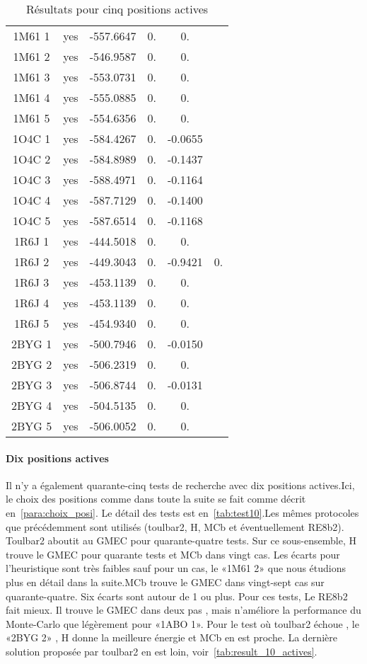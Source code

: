 \begin{table}[h]
{\begin{tabular}{cccccc}
        1M61 1 & yes &  -557.6647 & 0. & 0. &  \\
        1M61 2 & yes &  -546.9587 & 0. & 0. &  \\
        1M61 3 & yes &  -553.0731 & 0. & 0. &  \\
        1M61 4 & yes &  -555.0885 & 0. & 0. &  \\
        1M61 5 & yes &  -554.6356 & 0. & 0. &  \\
        1O4C 1 & yes &  -584.4267 & 0. & -0.0655 &  \\
        1O4C 2 & yes &  -584.8989 & 0. & -0.1437 &  \\
        1O4C 3 & yes &  -588.4971 & 0. & -0.1164 &  \\
        1O4C 4 & yes &  -587.7129 & 0. & -0.1400 &  \\
        1O4C 5 & yes &  -587.6514 & 0. & -0.1168 &  \\
        1R6J 1 & yes &  -444.5018 & 0. & 0. &  \\
        1R6J 2 & yes &  -449.3043 & 0. & -0.9421 & 0. \\
        1R6J 3 & yes &  -453.1139 & 0. & 0. &  \\
        1R6J 4 & yes &  -453.1139 & 0. & 0. &  \\
        1R6J 5 & yes &  -454.9340 & 0. & 0. &  \\
        2BYG 1 & yes &  -500.7946 & 0. & -0.0150 &  \\
        2BYG 2 & yes &  -506.2319 & 0. & 0. &  \\
        2BYG 3 & yes &  -506.8744 & 0. & -0.0131 &  \\
        2BYG 4 & yes &  -504.5135 & 0. & 0. &  \\
        2BYG 5 & yes &  -506.0052 & 0. & 0. &  \\
        \bottomrule
      \end{tabular}      
}
 \caption{Résultats pour cinq positions actives}
\label{tab:result_5_actives}
\end{table}

   \paragraph{Dix positions actives}
Il n'y a également quarante-cinq tests de recherche avec dix positions actives.Ici, le choix des positions comme dans toute la suite se fait comme décrit en~\ref{para:choix_posi}. Le détail des tests est en~\ref{tab:test10}.Les mêmes protocoles que précédemment sont utilisés (toulbar2, H, MCb et éventuellement RE8b2). Toulbar2 aboutit au GMEC pour quarante-quatre tests. Sur ce sous-ensemble, H trouve le GMEC pour quarante tests et MCb dans vingt cas. Les écarts pour l'heuristique sont très faibles sauf pour un cas, le «1M61 2» que nous étudions plus en détail dans la suite.MCb trouve le GMEC dans vingt-sept cas sur quarante-quatre. Six écarts sont autour de 1 ou plus. Pour ces tests, Le RE8b2 fait mieux. Il trouve le  GMEC dans deux pas , mais n'améliore la performance du Monte-Carlo que légèrement pour «1ABO 1». Pour le test où toulbar2 échoue , le «2BYG 2» , H donne la meilleure énergie et MCb en est proche. La dernière solution proposée par toulbar2 en est loin, voir~\ref{tab:result_10_actives}.  

